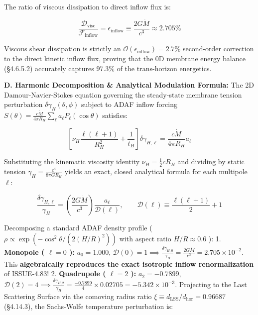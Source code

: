 \documentclass[11pt,a4paper]{article}
\theoremstyle{definition}\newtheorem{definition}{Definition}
\theoremstyle{remark}\newtheorem{remark}{Remark}
\begin{document}
The ratio of viscous dissipation to direct inflow flux is:


\begin{equation}
\frac{\mathcal{D}_{\text{visc}}}{\mathcal{F}_{\text{inflow}}} = \epsilon_{\text{inflow}} \equiv \frac{2 G \dot{M}}{c^3} \approx 2.705\%
\end{equation}


Viscous shear dissipation is strictly an $\mathcal{O}(\epsilon_{\text{inflow}}) = 2.7\%$ second-order correction to the direct kinetic inflow flux, proving that the 0D membrane energy balance (§4.6.5.2) accurately captures $97.3\%$ of the trans-horizon energetics.

\textbf{D. Harmonic Decomposition \& Analytical Modulation Formula:}
The 2D Damour-Navier-Stokes equation governing the steady-state membrane tension perturbation $\delta\gamma_H(\theta, \phi)$ subject to ADAF inflow forcing $S(\theta) = \frac{c \dot{M}}{4\pi R_H} \sum_\ell a_\ell P_\ell(\cos\theta)$ satisfies:


\begin{equation}
\left[ \nu_H \frac{\ell(\ell + 1)}{R_H^2} + \frac{1}{t_H} \right] \delta\gamma_{H, \ell} = \frac{c \dot{M}}{4\pi R_H} a_\ell
\end{equation}


Substituting the kinematic viscosity identity $\nu_H = \frac{1}{2} c R_H$ and dividing by static tension $\gamma_H = \frac{c^4}{8\pi G R_H}$ yields an exact, closed analytical formula for each multipole $\ell$:


\begin{equation}
\frac{\delta\gamma_{H, \ell}}{\gamma_H} = \left( \frac{2 G \dot{M}}{c^3} \right) \frac{a_\ell}{\mathcal{D}(\ell)}, \qquad \mathcal{D}(\ell) \equiv \frac{\ell(\ell + 1)}{2} + 1
\end{equation}


Decomposing a standard ADAF density profile ( $\rho \propto \exp(-\cos^2\theta / (2 (H/R)^2))$ with aspect ratio $H/R \approx 0.6$ ):
1. \textbf{Monopole ( $\ell = 0$ ):} $a_0 = 1.000$, $\mathcal{D}(0) = 1 \implies \frac{\delta\gamma_{H, 0}}{\gamma_H} = \frac{2 G \dot{M}}{c^3} = 2.705 \times 10^{-2}$. This \textbf{algebraically reproduces the exact isotropic inflow renormalization} of ISSUE-4.83!
2. \textbf{Quadrupole ( $\ell = 2$ ):} $a_2 = -0.7899$, $\mathcal{D}(2) = 4 \implies \frac{\delta\gamma_{H, 2}}{\gamma_H} = \frac{-0.7899}{4} \times 0.02705 = -5.342 \times 10^{-3}$.
Projecting to the Last Scattering Surface via the comoving radius ratio $\xi \equiv d_{\text{LSS}}/d_{\text{hor}} = 0.96687$ (§4.14.3), the Sachs-Wolfe temperature perturbation is:
\end{document}

